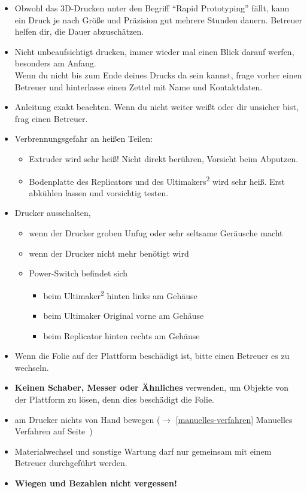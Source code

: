 \documentclass{\basedir/fablab-document}
\newcommand{\ts}[1]{\textsuperscript{#1}}
\begin{document}
\begin{itemize}
 \item Obwohl das 3D-Drucken unter den Begriff ``Rapid Prototyping'' fällt, kann ein Druck je nach Größe und 
 Präzision gut mehrere Stunden dauern. Betreuer helfen dir, die Dauer abzuschätzen. 
 \item Nicht unbeaufsichtigt drucken, immer wieder mal einen Blick darauf werfen, besonders am Anfang.\\
Wenn du nicht bis zum Ende deines Drucks da sein kannst, frage vorher einen Betreuer und hinterlasse einen Zettel mit Name und Kontaktdaten.
 \item Anleitung exakt beachten. Wenn du nicht weiter weißt oder dir unsicher bist, frag einen Betreuer.
 \item Verbrennungsgefahr an heißen Teilen:
  \begin{itemize}
   \item Extruder wird sehr heiß! Nicht direkt berühren, Vorsicht beim Abputzen.
   \item Bodenplatte des Replicators und des Ultimakers\ts2 wird sehr heiß. Erst abkühlen lassen und vorsichtig testen.
  \end{itemize}
 \item Drucker ausschalten,
 \begin{itemize}
  \item wenn der Drucker groben Unfug oder sehr seltsame Geräusche macht
  \item wenn der Drucker nicht mehr benötigt wird
  \item Power-Switch befindet sich
  \begin{itemize}
   \item beim Ultimaker\ts2 hinten links am Gehäuse
   \item beim Ultimaker Original vorne am Gehäuse
   \item beim Replicator hinten rechts am Gehäuse
  \end{itemize}
 \end{itemize}
 \item Wenn die Folie auf der Plattform beschädigt ist, bitte einen Betreuer es zu wechseln.
 \item \textbf{Keinen Schaber, Messer oder Ähnliches} verwenden, um Objekte von der Plattform zu lösen, denn dies beschädigt die Folie.
 \item am Drucker nichts von Hand bewegen ($\to$ \ref{manuelles-verfahren} Manuelles Verfahren auf Seite\, \pageref{manuelles-verfahren})
 \item Materialwechsel und sonstige Wartung darf nur gemeinsam mit einem Betreuer durchgeführt werden.
 \item \textbf{Wiegen und Bezahlen nicht vergessen!}
\end{itemize}
\newpage
\end{document}
